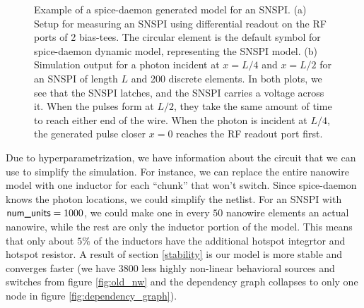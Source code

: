 \begin{figure}
    \centering
    \caption{Example of a spice-daemon generated model for an SNSPI. (a) Setup
    for measuring an SNSPI using differential readout on the RF ports of 2 bias-tees.
    The circular element is the default symbol for spice-daemon dynamic model, 
    representing the SNSPI model. (b) Simulation output for a photon incident at
    $x=L/4$ and $x=L/2$ for an SNSPI of length $L$ and 200 discrete elements. 
    In both plots, we see that the SNSPI latches, and the SNSPI carries
    a voltage across it.
    When the pulses form at $L/2$, they take the same amount of time to reach 
    either end of the wire.
    When the photon is incident at $L/4$, the generated pulse closer $x=0$ reaches
    the RF readout port first.}
    \label{fig:snspi_run}
\end{figure}

Due to hyperparametrization, we have information about the circuit that we can use to
simplify the simulation. For instance, we can replace the entire nanowire model with
one inductor for each ``chunk'' that won't switch. Since spice-daemon knows the 
photon locations, we could simplify the netlist. For an SNSPI with $\textsf{num\_units}=1000$,
we could make one in every $50$ nanowire elements an actual nanowire, while the
rest are only the inductor portion of the model. This means that only about $5\%$ of the inductors
have the additional hotspot integrtor and hotspot resistor. A result of section 
\ref{stability} is our model is more stable and converges faster (we have $3800$ less
highly non-linear behavioral sources and switches from figure \ref{fig:old_nw} and 
the dependency graph collapses
to only one node in figure \ref{fig:dependency_graph}).

